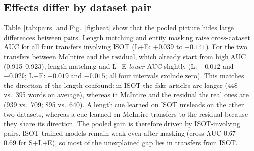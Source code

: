 \subsection{Effects differ by dataset pair}
\begin{table}[t]
\caption{Archived protocol: TF-IDF + LR: change in cross-dataset AUC relative to the baseline, per ordered pair (mean over eight seeds; \textbf{bold}: 95\% interval over seeds excludes zero). The first column is the baseline AUC.}
\label{tab:pairs}
\centering\footnotesize
{}
\end{table}

Table~\ref{tab:pairs} and Fig.~\ref{fig:heat} show that the pooled picture hides large differences between pairs. Length matching and entity masking raise cross-dataset AUC for all four transfers involving ISOT (L+E: $+0.039$ to $+0.141$). For the two transfers between McIntire and the residual, which already start from high AUC (0.915--0.923), length matching and L+E \emph{lower} AUC slightly (L: $-0.012$ and $-0.020$; L+E: $-0.019$ and $-0.015$; all four intervals exclude zero). This matches the direction of the length confound: in ISOT the fake articles are longer (448 vs.\ 395 words on average), whereas in McIntire and the residual the real ones are (939 vs.\ 709; 895 vs.\ 640). A length cue learned on ISOT misleads on the other two datasets, whereas a cue learned on McIntire transfers to the residual because they share its direction. The pooled gain is therefore driven by ISOT-involving pairs. ISOT-trained models remain weak even after masking (cross AUC 0.67--0.69 for S+L+E), so most of the unexplained gap lies in transfers from ISOT.

